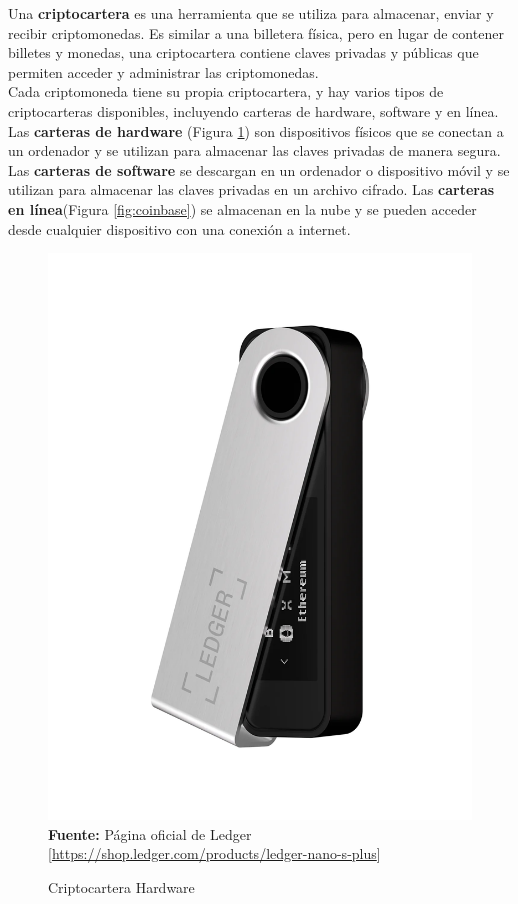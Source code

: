 Una \textbf{criptocartera} es una herramienta que se utiliza para almacenar, 
enviar y recibir criptomonedas. Es similar a una billetera física, pero en 
lugar de contener billetes y monedas, una criptocartera contiene claves 
privadas y públicas que permiten acceder y administrar las criptomonedas.\\
\hfill \break
Cada criptomoneda tiene su propia criptocartera, y hay varios tipos de 
criptocarteras disponibles, incluyendo carteras de hardware, software y en 
línea. Las \textbf{carteras de hardware} (Figura \ref*{fig:ledger}) son dispositivos físicos que se conectan a 
un ordenador y se utilizan para almacenar las claves privadas de manera segura. 
Las \textbf{carteras de software} se descargan en un ordenador o dispositivo 
móvil y se utilizan para almacenar las claves privadas en un archivo cifrado. 
Las \textbf{carteras en línea}(Figura \ref*{fig:coinbase}) se almacenan en la nube y se pueden acceder 
desde cualquier dispositivo con una conexión a internet.
\begin{figure}[htb!]
    \caption{Criptocartera Hardware}
    \centering
    \label{fig:ledger}
    \includegraphics[scale=0.15]{./Ilustraciones/ledger-hardware.png}\\
    \textbf{Fuente:} Página oficial de Ledger [\url{https://shop.ledger.com/products/ledger-nano-s-plus}]
\end{figure}
